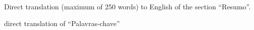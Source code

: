 Direct translation (maximum of 250 words) to English of the section ``Resumo''.

\mbox{}\linebreak
{} direct translation of ``Palavras-chave''
